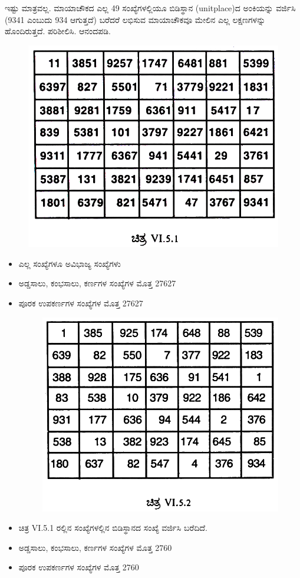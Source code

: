 ಇಷ್ಟು ಮಾತ್ರವಲ್ಲ. ಮಾಯಾಚೌಕದ ಎಲ್ಲ 49 ಸಂಖ್ಯೆಗಳಲ್ಲಿಯೂ ಬಿಡಿಸ್ಥಾನ (unitplace)ದ ಅಂಕಿಯನ್ನು ವರ್ಜಿಸಿ (9341 ಎಂಬುದು 934 ಆಗುತ್ತದೆ) ಬರೆದರೆ ಲಭಿಸುವ ಮಾಯಾಚೌಕವೂ ಮೇಲಿನ ಎಲ್ಲ ಲಕ್ಷಣಗಳನ್ನು ಹೊಂದಿರುತ್ತದೆ. ಪರಿಶೀಲಿಸಿ. ಆನಂದಪಡಿ.
\begin{figure}[H]
\includegraphics{src/figures/chap5/fig5-6.jpg}
\end{figure}
\begin{itemize}
	\item ಎಲ್ಲ ಸಂಖ್ಯೆಗಳೂ ಅವಿಭಾಜ್ಯ ಸಂಖ್ಯೆಗಳು
	\item ಅಡ್ಡಸಾಲು, ಕಂಭಸಾಲು, ಕರ್ಣಗಳ ಸಂಖ್ಯೆಗಳ ಮೊತ್ತ 27627
	\item ಪೂರಕ ಉಪಕರ್ಣಗಳ ಸಂಖ್ಯೆಗಳ ಮೊತ್ತ 27627
	\begin{figure}[H]
	\includegraphics{src/figures/chap5/fig5-7.jpg}
	\end{figure}
	\item ಚಿತ್ರ VI.5.1 ರಲ್ಲಿನ ಸಂಖ್ಯೆಗಳಲ್ಲಿನ ಬಿಡಿಸ್ಥಾನದ ಸಂಖ್ಯೆ ವರ್ಜಿಸಿ ಬರೆದಿದೆ.
	\item ಅಡ್ಡಸಾಲು, ಕಂಭಸಾಲು, ಕರ್ಣಗಳ ಸಂಖ್ಯೆಗಳ ಮೊತ್ತ 2760
	\item ಪೂರಕ ಉಪಕರ್ಣಗಳ ಸಂಖ್ಯೆಗಳ ಮೊತ್ತ 2760
\end{itemize}

